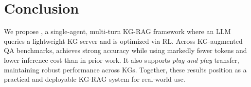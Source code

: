 \section{Conclusion}

We propose \framework{}, a single-agent, multi-turn KG-RAG framework where an LLM queries a lightweight KG server and is optimized via RL. Across KG-augmented QA benchmarks, \framework{} achieves strong accuracy while using markedly fewer tokens and lower inference cost than in prior work. It also supports \emph{plug-and-play} transfer, maintaining robust performance across KGs. Together, these results position \framework{} as a practical and deployable KG-RAG system for real-world use. 
